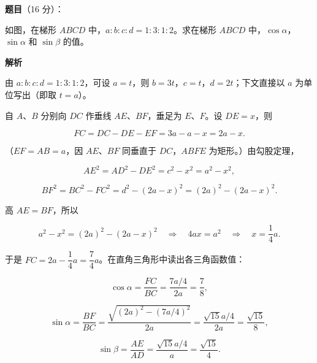 \begin{answer}

\textbf{题目}（16 分）：

如图，在梯形 $ABCD$ 中，$a:b:c:d=1:3:1:2$。求在梯形 $ABCD$ 中，$\cos\alpha$，$\sin\alpha$ 和 $\sin\beta$ 的值。

\textbf{解析}
\nopagebreak[4]
\begin{center}\end{center}
\nopagebreak[4]
由 $a:b:c:d=1:3:1:2$，可设 $a=t$，则 $b=3t$，$c=t$，$d=2t$；下文直接以 $a$ 为单位写出（即取 $t=a$）。

自 $A$、$B$ 分别向 $DC$ 作垂线 $AE$、$BF$，垂足为 $E$、$F$。设 $DE=x$，则

\nopagebreak[4]
\[
FC=DC-DE-EF=3a-a-x=2a-x.
\]

（$EF=AB=a$，因 $AE$、$BF$ 同垂直于 $DC$，$ABFE$ 为矩形。）由勾股定理，

\nopagebreak[4]
\[
AE^2=AD^2-DE^2=c^2-x^2=a^2-x^2,
\]

\nopagebreak[4]
\[
BF^2=BC^2-FC^2=d^2-(2a-x)^2=(2a)^2-(2a-x)^2.
\]

高 $AE=BF$，所以

\nopagebreak[4]
\[
a^2-x^2=(2a)^2-(2a-x)^2
\quad\Longrightarrow\quad
4ax=a^2
\quad\Longrightarrow\quad
x=\frac14a.
\]

于是 $FC=2a-\dfrac14a=\dfrac74a$。在直角三角形中读出各三角函数值：

\nopagebreak[4]
\[
\cos\alpha=\frac{FC}{BC}=\frac{7a/4}{2a}=\frac78,
\]

\nopagebreak[4]
\[
\sin\alpha=\frac{BF}{BC}
=\frac{\sqrt{(2a)^2-(7a/4)^2}}{2a}
=\frac{\sqrt{15}a/4}{2a}
=\frac{\sqrt{15}}8,
\]

\nopagebreak[4]
\[
\sin\beta=\frac{AE}{AD}
=\frac{\sqrt{15}a/4}{a}
=\frac{\sqrt{15}}4.
\]


\end{answer}
